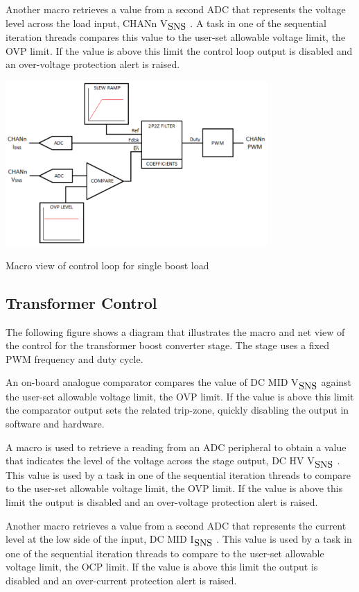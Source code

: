 Another macro retrieves a value from a second A\-D\-C that represents the voltage level across the load input, C\-H\-A\-Nn V$_{\mbox{S\-N\-S}}$ . A task in one of the sequential iteration threads compares this value to the user-\/set allowable voltage limit, the O\-V\-P limit. If the value is above this limit the control loop output is disabled and an over-\/voltage protection alert is raised.


\begin{DoxyImage}
\includegraphics[width=10cm]{boost_load_loop}
\caption{Macro view of control loop for single boost load}
\end{DoxyImage}
\hypertarget{index_xfmrctrl}{}\subsection{Transformer Control}\label{index_xfmrctrl}
The following figure shows a diagram that illustrates the macro and net view of the control for the transformer boost converter stage. The stage uses a fixed P\-W\-M frequency and duty cycle.

An on-\/board analogue comparator compares the value of D\-C M\-I\-D V$_{\mbox{S\-N\-S}}$  against the user-\/set allowable voltage limit, the O\-V\-P limit. If the value is above this limit the comparator output sets the related trip-\/zone, quickly disabling the output in software and hardware.

A macro is used to retrieve a reading from an A\-D\-C peripheral to obtain a value that indicates the level of the voltage across the stage output, D\-C H\-V V$_{\mbox{S\-N\-S}}$ . This value is used by a task in one of the sequential iteration threads to compare to the user-\/set allowable voltage limit, the O\-V\-P limit. If the value is above this limit the output is disabled and an over-\/voltage protection alert is raised.

Another macro retrieves a value from a second A\-D\-C that represents the current level at the low side of the input, D\-C M\-I\-D I$_{\mbox{S\-N\-S}}$ . This value is used by a task in one of the sequential iteration threads to compare to the user-\/set allowable voltage limit, the O\-C\-P limit. If the value is above this limit the output is disabled and an over-\/current protection alert is raised.


